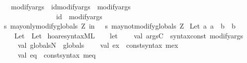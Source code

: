 \begin{isabellebody}
\ \ {\isachardoublequoteopen}{\isacharunderscore}modifyargs{\isachardoublequoteclose}\ {\isacharcolon}{\isacharcolon}\ {\isachardoublequoteopen}{\isacharbrackleft}id{\isacharcomma}modifyargs{\isacharbrackright}\ {\isasymRightarrow}\ modifyargs{\isachardoublequoteclose}\ {\isacharparenleft}{\isachardoublequoteopen}{\isacharunderscore}{\isacharcomma}{\isacharslash}\ {\isacharunderscore}{\isachardoublequoteclose}{\isacharparenright}\isanewline
\ \ {\isachardoublequoteopen}{\isachardoublequoteclose}\ \ \ \ \ \ \ \ \ \ \ \ {\isacharcolon}{\isacharcolon}\ {\isachardoublequoteopen}id\ {\isacharequal}{\isachargreater}\ modifyargs{\isachardoublequoteclose}\ \ \ \ \ \ \ \ \ \ \ \ \ \ {\isacharparenleft}{\isachardoublequoteopen}{\isacharunderscore}{\isachardoublequoteclose}{\isacharparenright}\isanewline
\isanewline
{}\isamarkupfalse%
\isanewline
{\isachardoublequoteopen}s\ may{\isacharunderscore}only{\isacharunderscore}modify{\isacharunderscore}globals\ Z\ in\ {\isacharbrackleft}{\isacharbrackright}{\isachardoublequoteclose}\ {\isacharequal}{\isachargreater}\ {\isachardoublequoteopen}s\ may{\isacharunderscore}not{\isacharunderscore}modify{\isacharunderscore}globals\ Z{\isachardoublequoteclose}\isanewline
\isanewline
\isanewline
{}\isamarkupfalse%
\ Let{\isacharprime}{\isacharcolon}{\isacharcolon}\ {\isachardoublequoteopen}{\isacharbrackleft}{\isacharprime}a{\isacharcomma}\ {\isacharprime}a\ {\isacharequal}{\isachargreater}\ {\isacharprime}b{\isacharbrackright}\ {\isacharequal}{\isachargreater}\ {\isacharprime}b{\isachardoublequoteclose}\isanewline
\ \ \ {\isachardoublequoteopen}Let{\isacharprime}\ {\isacharequal}\ Let{\isachardoublequoteclose}\isanewline
%
\isadelimML
\isanewline
%
\endisadelimML
%
\isatagML
{}\isamarkupfalse%
\ {\isachardoublequoteopen}hoare{\isacharunderscore}syntax{\isachardot}ML{\isachardoublequoteclose}\isanewline
\isanewline
\isanewline
{}\isamarkupfalse%
\ {\isacartoucheopen}\isanewline
\ \ let\isanewline
\ \ \ \ val\ argsC\ {\isacharequal}\ {\isacharat}{\isacharbraceleft}syntax{\isacharunderscore}const\ {\isachardoublequote}{\isacharunderscore}modifyargs{\isachardoublequote}{\isacharbraceright}{\isacharsemicolon}\isanewline
\ \ \ \ val\ globalsN\ {\isacharequal}\ {\isachardoublequote}globals{\isachardoublequote}{\isacharsemicolon}\isanewline
\ \ \ \ val\ ex\ {\isacharequal}\ {\isacharat}{\isacharbraceleft}const{\isacharunderscore}syntax\ mex{\isacharbraceright}{\isacharsemicolon}\isanewline
\ \ \ \ val\ eq\ {\isacharequal}\ {\isacharat}{\isacharbraceleft}const{\isacharunderscore}syntax\ meq{\isacharbraceright}{\isacharsemicolon}\isanewline

\end{isabellebody}
